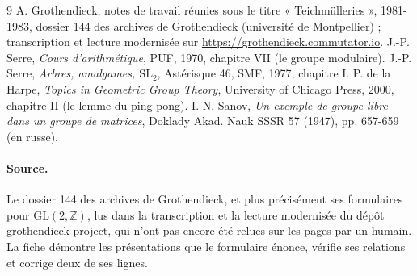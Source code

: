 \documentclass[11pt,a4paper]{article}
\theoremstyle{plain}
\theoremstyle{definition}
\theoremstyle{remark}
\newcommand{\Z}{\mathbb{Z}}
\newcommand{\SL}{\mathrm{SL}}
\newcommand{\GL}{\mathrm{GL}}
\begin{document}
\begin{thebibliography}{9}
 A. Grothendieck, notes de travail réunies sous le titre « Teichmülleries », 1981-1983, dossier 144 des archives de Grothendieck (université de Montpellier) ; transcription et lecture modernisée sur \url{https://grothendieck.commutator.io}.
 J.-P. Serre, \emph{Cours d'arithmétique}, PUF, 1970, chapitre VII (le groupe modulaire).
 J.-P. Serre, \emph{Arbres, amalgames, $\SL_2$}, Astérisque 46, SMF, 1977, chapitre I.
 P. de la Harpe, \emph{Topics in Geometric Group Theory}, University of Chicago Press, 2000, chapitre II (le lemme du ping-pong).
 I. N. Sanov, \emph{Un exemple de groupe libre dans un groupe de matrices}, Doklady Akad. Nauk SSSR 57 (1947), pp. 657-659 (en russe).
\end{thebibliography}

\paragraph{Source.} Le dossier 144 des archives de Grothendieck, et plus précisément ses formulaires pour $\GL(2,\Z)$, lus dans la transcription et la lecture modernisée du dépôt grothendieck-project, qui n'ont pas encore été relues sur les pages par un humain. La fiche démontre les présentations que le formulaire énonce, vérifie ses relations et corrige deux de ses lignes.
\end{document}
